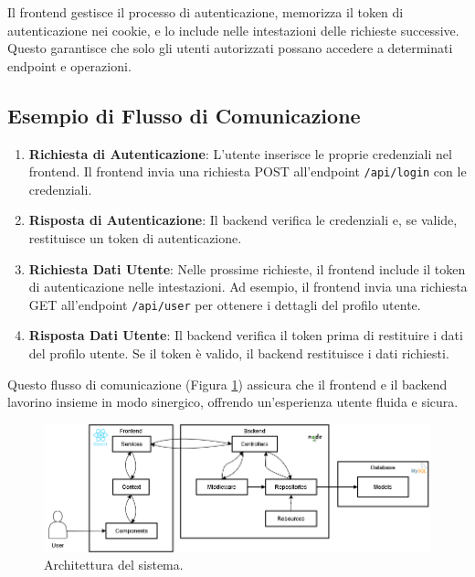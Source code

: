 \documentclass[twoside]{supsistudent}
\begin{document}
Il frontend gestisce il processo di autenticazione, memorizza il token di autenticazione nei cookie, e lo include nelle intestazioni delle richieste successive. Questo garantisce che solo gli utenti autorizzati possano accedere a determinati endpoint e operazioni.

\subsection{Esempio di Flusso di Comunicazione}

\begin{enumerate}
  \item \textbf{Richiesta di Autenticazione}: L'utente inserisce le proprie credenziali nel frontend. Il frontend invia una richiesta POST all'endpoint \texttt{/api/login} con le credenziali.
  \item \textbf{Risposta di Autenticazione}: Il backend verifica le credenziali e, se valide, restituisce un token di autenticazione.
  \item \textbf{Richiesta Dati Utente}: Nelle prossime richieste, il frontend include il token di autenticazione nelle intestazioni. Ad esempio, il frontend invia una richiesta GET all'endpoint \texttt{/api/user} per ottenere i dettagli del profilo utente.
  \item \textbf{Risposta Dati Utente}: Il backend verifica il token prima di restituire i dati del profilo utente. Se il token è valido, il backend restituisce i dati richiesti.
\end{enumerate}

Questo flusso di comunicazione (Figura \ref{fig:architettura}) assicura che il frontend e il backend lavorino insieme in modo sinergico, offrendo un'esperienza utente fluida e sicura.

\begin{figure}[t]
  \centering
  \includegraphics[scale=0.5]{./images/architettura.png}
  \caption{Architettura del sistema.}
  \label{fig:architettura}
\end{figure}

\negmedspace
\end{document}

